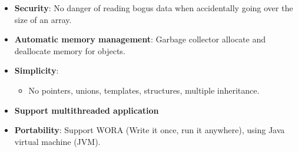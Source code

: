 \begin{flushleft}
	
	\begin{itemize}
		\item \textbf{Security}: No danger of reading bogus data when accidentally going over the size of an array.
		
		\item \textbf{Automatic memory management}: Garbage collector allocate and deallocate memory for objects. 
		
		\item \textbf{Simplicity}: 
		\begin{itemize}
			\item No pointers, unions, templates, structures, multiple inheritance. 
		\end{itemize}
		
		\item \textbf{Support multithreaded application}
		
		\item \textbf{Portability}: Support WORA (Write it once, run it anywhere), using Java virtual machine (JVM).
		
	\end{itemize}

\end{flushleft}

\newpage